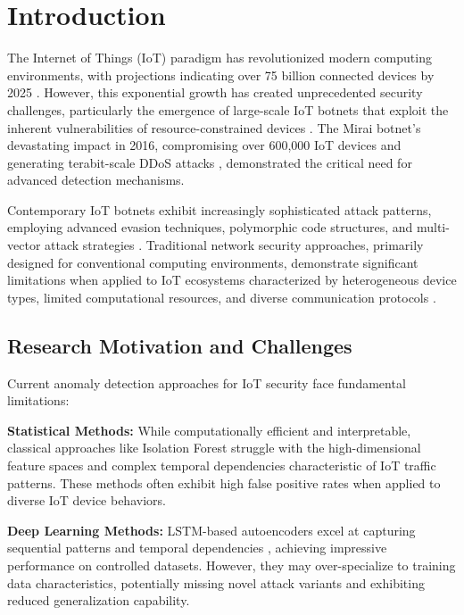 \documentclass[conference]{IEEEtran}
\begin{document}
\section{Introduction}

The Internet of Things (IoT) paradigm has revolutionized modern computing environments, with projections indicating over 75 billion connected devices by 2025 \cite{iot_forecast}. However, this exponential growth has created unprecedented security challenges, particularly the emergence of large-scale IoT botnets that exploit the inherent vulnerabilities of resource-constrained devices \cite{kolias2017ddos}. The Mirai botnet's devastating impact in 2016, compromising over 600,000 IoT devices and generating terabit-scale DDoS attacks \cite{antonakakis2017understanding}, demonstrated the critical need for advanced detection mechanisms.

Contemporary IoT botnets exhibit increasingly sophisticated attack patterns, employing advanced evasion techniques, polymorphic code structures, and multi-vector attack strategies \cite{bertino2017botnets}. Traditional network security approaches, primarily designed for conventional computing environments, demonstrate significant limitations when applied to IoT ecosystems characterized by heterogeneous device types, limited computational resources, and diverse communication protocols \cite{raza2013svelte}.

\subsection{Research Motivation and Challenges}

Current anomaly detection approaches for IoT security face fundamental limitations:

\textbf{Statistical Methods:} While computationally efficient and interpretable, classical approaches like Isolation Forest \cite{liu2008isolation} struggle with the high-dimensional feature spaces and complex temporal dependencies characteristic of IoT traffic patterns. These methods often exhibit high false positive rates when applied to diverse IoT device behaviors.

\textbf{Deep Learning Methods:} LSTM-based autoencoders excel at capturing sequential patterns and temporal dependencies \cite{malhotra2016lstm}, achieving impressive performance on controlled datasets. However, they may over-specialize to training data characteristics, potentially missing novel attack variants and exhibiting reduced generalization capability.
\end{document}
